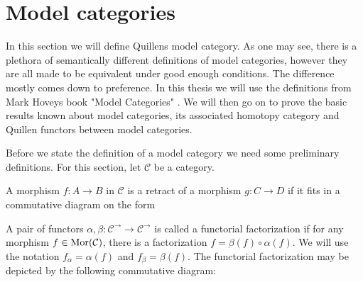 \documentclass[../thesis.tex]{subfiles}
\begin{document}
    \section{Model categories}

        In this section we will define Quillens model category. As one may see, there is a plethora of semantically different definitions of model categories, however they are all made to be equivalent under good enough conditions. The difference mostly comes down to preference. In this thesis we will use the definitions from Mark Hoveys book "Model Categories" \cite{Hovey99}. We will then go on to prove the basic results known about model categories, its associated homotopy category and Quillen functors between model categories.

        Before we state the definition of a model category we need some preliminary definitions. For this section, let $\mathcal{C}$ be a category.

        \begin{definition}[Retract]
            A morphism $f:A\rightarrow B$ in $\mathcal{C}$ is a retract of a morphism $g: C\rightarrow D$ if it fits in a commutative diagram on the form
            \begin{center}
            \end{center}
        \end{definition}

        \begin{definition}
            A pair of functors $\alpha, \beta: \mathcal{C}^\rightarrow\rightarrow\mathcal{C}^\rightarrow$ is called a functorial factorization if for any morphism $f\in \tt{Mor}(\mathcal{C})$, there is a factorization $f = \beta(f)\circ\alpha(f)$. We will use the notation $f_\alpha = \alpha(f)$ and $f_\beta = \beta(f)$. The functorial factorization may be depicted by the following commutative diagram:
            \begin{center}
            \end{center}
        \end{definition}
\end{document}
